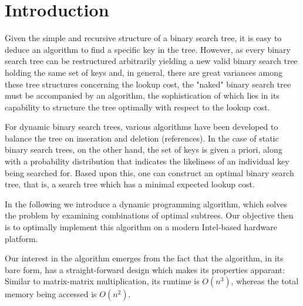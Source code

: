 
\section{Introduction}\label{sec:intro}
Given the simple and recursive structure of a binary search tree, it is easy to
deduce an algorithm to find a specific key in the tree. However, as every binary
search tree can be restructured arbitrarily yielding a new valid binary search
tree holding the same set of keys and, in general, there are great variances
among these tree structures concerning the lookup cost, the "naked"
binary search tree must be accompanied by an algorithm, the sophistication of
which lies in its capability to structure the tree optimally with respect to the
lookup cost.

For dynamic binary search trees, various algorithms have been developed to
balance the tree on inseration and deletion (references). In the case of static
binary search trees, on the other hand, the set of keys is given a priori, along
with a probability distribution that indicates the likeliness of an individual
key being searched for. Based upon this, one can construct an optimal binary
search tree, that is, a search tree which has a minimal expected lookup cost.

In the following we introduce a dynamic programming algorithm, which solves the
problem by examining combinations of optimal subtrees. Our objective then is to
optimally implement this algorithm on a modern Intel-based hardware platform.

Our interest in the algorithm emerges from the fact that the algorithm, in its
bare form, has a straight-forward design which makes its properties apparant:
Similar to matrix-matrix multiplication, its runtime is $O(n^3)$, whereas the
total memory being accessed is $O(n^2)$.
